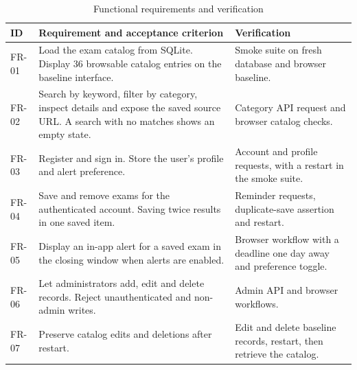\documentclass[12pt,a4paper]{report}
\begin{document}
\begin{table}[H]
\centering\small
\begin{tabular}{>{\raggedright\arraybackslash}p{}>{\raggedright\arraybackslash}p{}>{\raggedright\arraybackslash}p{}}
\toprule
\textbf{ID} & \textbf{Requirement and acceptance criterion} & \textbf{Verification} \\ \midrule
FR-01 & Load the exam catalog from SQLite. Display 36 browsable catalog entries on the baseline interface. & Smoke suite on fresh database and browser baseline. \\
FR-02 & Search by keyword, filter by category, inspect details and expose the saved source URL. A search with no matches shows an empty state. & Category API request and browser catalog checks. \\
FR-03 & Register and sign in. Store the user's profile and alert preference. & Account and profile requests, with a restart in the smoke suite. \\
FR-04 & Save and remove exams for the authenticated account. Saving twice results in one saved item. & Reminder requests, duplicate-save assertion and restart. \\
FR-05 & Display an in-app alert for a saved exam in the closing window when alerts are enabled. & Browser workflow with a deadline one day away and preference toggle. \\
FR-06 & Let administrators add, edit and delete records. Reject unauthenticated and non-admin writes. & Admin API and browser workflows. \\
FR-07 & Preserve catalog edits and deletions after restart. & Edit and delete baseline records, restart, then retrieve the catalog. \\
\bottomrule
\end{tabular}
\setcounter{table}{4}
\caption{Functional requirements and verification}
\end{table}
\end{document}
